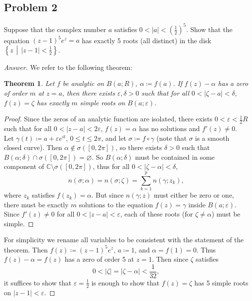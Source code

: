 \documentclass[12pt]{article}
\newcommand{\cx}{\mathbb{C}}
\newcommand\paren[1]{\left( #1 \right)}
\newcommand\setb[1]{\left \{ #1 \right \}}
\newcommand{\eps}{\varepsilon}
\newtheorem{theorem}{Theorem}[section]
\theoremstyle{definition}
\begin{document}
\subsection{Problem 2 \texorpdfstring{\cite{Conway}}{}}
Suppose that the complex number $a$ satisfies $\displaystyle 0 < |a| < \paren{ \frac{1}{2} }^5$. Show that the equation $(z - 1)^5 e^z = a$ has exactly 5 roots (all distinct) in the disk $\setb{ z \, \middle| \, |z - 1| < \frac{1}{2} }$.
\begin{proof}[Answer]
    We refer to the following theorem:
    \begin{theorem}
        Let $f$ be analytic on $B(a;R)$, $\alpha \coloneqq f(a)$. If $f(z) - \alpha$ has a zero of order $m$ at $z = a$, then there exists $\eps , \delta > 0$ such that for all $0 < |\zeta - a| < \delta$, $f(z) = \zeta$ has exactly $m$ simple roots on $B(a;\eps)$.
    \end{theorem}
    \begin{proof}
        Since the zeros of an analytic function are isolated, there exists $0 < \eps < \frac{1}{2}R$ such that for all $0 < |z-a| < 2\eps$, $f(z) = \alpha$ has no solutions and $f'(z) \neq 0$. Let $\gamma(t) \coloneqq a + \eps e^{it}$, $0 \leq t \leq 2\pi$, and let $\sigma \coloneqq f \circ \gamma$ (note that $\sigma$ is a smooth closed curve). Then $\alpha \notin \sigma \paren{ [0,2\pi] }$, so there exists $\delta > 0$ such that $B(\alpha;\delta) \cap \sigma \paren{ [0,2\pi] } = \varnothing$. So $B(\alpha;\delta)$ must be contained in some component of $\cx \setminus \sigma \paren{ [0,2\pi] }$, thus for all $0 < |\zeta - \alpha| < \delta$,
        \[
            n(\sigma;\alpha) = n(\sigma;\zeta) = \sum\limits_{k = 1}^p n \paren{ \gamma ; z_k },
        \]
        where $z_k$ satisfies $f \paren{ z_k } = \alpha$. But since $n(\gamma;z)$ must either be zero or one, there must be exactly $m$ solutions to the equation $f(z) = \gamma$ inside $B(a;\eps)$. Since $f'(z) \neq 0$ for all $0 < |z-a| < \eps$, each of these roots (for $\zeta \neq \alpha$) must be simple.
    \end{proof}
    For simplicity we rename all variables to be consistent with the statement of the theorem. Then $f(z) \coloneqq (z-1)^5 e^{z}$, $a \coloneqq 1$, and $\alpha = f(1) = 0$. Thus $f(z) - \alpha = f(z)$ has a zero of order 5 at $z = 1$. Then since $\zeta$ satisfies 
    \[
        0 < |\zeta| = |\zeta - \alpha| < \frac{1}{32},
    \]
    it suffices to show that $\eps = \frac{1}{2}$ is enough to show that $f(z) = \zeta$ has 5 simple roots on $|z-1| < \eps$. 
    

\end{proof}
\end{document}
